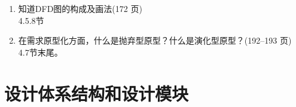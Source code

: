 \documentclass[14pt, letterpaper, UTF8, fontset=windowsnew, heading=true]{article}
\begin{document}
\begin{enumerate}
	

	\item 知道DFD图的构成及画法(172 页) \\ 4.5.8节
	
	\item 在需求原型化方面，什么是抛弃型原型？什么是演化型原型？(192--193 页) \\
	4.7节末尾。
	

\end{enumerate}

\section{设计体系结构和设计模块}
\end{document}
